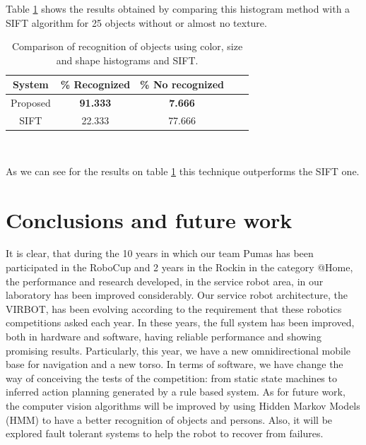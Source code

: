 \documentclass{llncs}
\begin{document}
Table \ref{tab:comp} shows the results obtained by comparing this histogram method with a SIFT algorithm for 25 objects
without or almost no texture.


\begin{table}
\centering
\begin{tabular}{|c||c|c|c|c|}
 \hline
System & \% Recognized & \% No recognized  \\
 \hline
Proposed & \textbf{91.333} & \textbf{7.666} \\
SIFT & 22.333 & 77.666 \\
\hline
\end{tabular}
\\
\caption{Comparison of recognition of objects using color, size and shape histograms and SIFT.}
\label{tab:comp}
\end{table}

As we can see for the results on table \ref{tab:comp} this technique outperforms the SIFT one.




\section{Conclusions and future work}\label{sec:conclusions}
It is clear, that during the 10 years in which our team Pumas has been participated in the RoboCup and 2 years
in the Rockin \cite{Rockin} in the category @Home, the performance and research developed, in the service robot area, in our 
laboratory has been improved considerably.
Our service robot architecture, the VIRBOT, has been evolving according to the requirement that these robotics
competitions asked each year.
In these years, the full system has been improved, both in hardware and software, having reliable performance and showing promising 
results. Particularly, this year, we have a new omnidirectional mobile base for navigation and a new torso. 
In terms of software, we have change the way of conceiving the tests of the competition: from static state machines to inferred
action planning generated by a rule based system. 
As for future work, the computer vision algorithms will be improved by using Hidden Markov Models (HMM) to have a better 
recognition of objects and persons. Also, it will be explored fault tolerant systems to help the robot to recover from failures.
\end{document}
